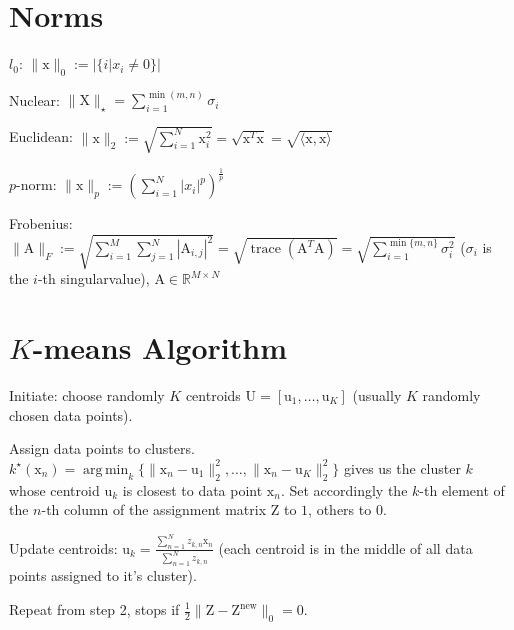 \documentclass[a4paper, 11pt, landscape]{article}
\newcommand{\matr}[1]{\boldsymbol{\mathrm{#1}}}
\DeclareMathOperator*{\argmin}{arg\,min}
\begin{document}
\begin{multicols*}{3}
\section{Norms}
\begin{compactdesc}
	\begin{listcols}
		\item[$l_0$:] $\|\matr{x}\|_0 := |\{i | x_i \neq 0\}|$
		\item[Nuclear:] $\|\matr{X}\|_\star = \sum_{i=1}^{\min(m, n)} \sigma_i$
	\end{listcols}
	\item[Euclidean:] $\|\matr{x}\|_2 := \sqrt{\sum_{i=1}^{N} \matr{x}_i^2} = \sqrt{\matr{x}^T \matr{x}} = \sqrt{\langle \matr{x}, \matr{x} \rangle}$
	\item[$p$-norm:] $\|\matr{x}\|_p := \left( \sum_{i=1}^{N} |x_i|^p \right)^{\frac{1}{p}}$
	\item[Frobenius:] $\|\matr{A}\|_F :=\allowbreak \sqrt{\sum_{i=1}^{M} \sum_{j=1}^{N} |\matr{A}_{i, j}|^2} =\allowbreak \sqrt{\operatorname{trace}(\matr{A}^T \matr{A})} =\allowbreak \sqrt{\sum_{i=1}^{\min\{m, n\}} \sigma_i^2}$ ($\sigma_i$ is the $i$-th singularvalue), $\matr{A} \in \mathbb{R}^{M \times N}$
\end{compactdesc}

\section{$K$-means Algorithm}
\begin{compactenum}
	\item Initiate: choose randomly $K$ centroids $\matr{U} = [\matr{u}_1, \ldots, \matr{u}_K]$ (usually $K$ randomly chosen data points).
	\item Assign data points to clusters. $k^\star(\matr{x}_n) = \argmin_k \{ \|\matr{x}_n - \matr{u}_1\|_2^2, \ldots, \|\matr{x}_n - \matr{u}_K\|_2^2 \}$ gives us the cluster $k$ whose centroid $\matr{u}_k$ is closest to data point $\matr{x}_n$. Set accordingly the $k$-th element of the $n$-th column of the assignment matrix $\matr{Z}$ to $1$, others to $0$.
	\item Update centroids: $\matr{u}_k = \frac{\sum_{n=1}^N z_{k,n} \matr{x}_n}{\sum_{n=1}^N z_{k,n}}$ (each centroid is in the middle of all data points assigned to it's cluster).
	\item Repeat from step 2, stops if $\frac{1}{2} \|\matr{Z} - \matr{Z}^\text{new}\|_0 = 0$.
\end{compactenum}


\end{multicols*}
\end{document}

